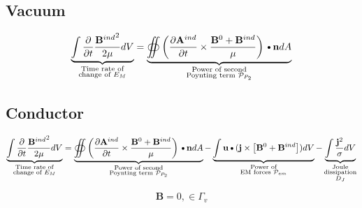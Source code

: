 \documentclass[11pt]{article}
\newcommand{\A}{\mathbf{A}}
\newcommand{\B}{\mathbf{B}}
\newcommand{\PD}{\partial}
\newcommand{\J}{\mathbf{j}}
\newcommand{\N}{\mathbf{n}}
\newcommand{\JSS}{\frac{\mathbf{j}^2}{\sigma}}
\newcommand{\U}{\mathbf{u}}
\newcommand{\DOT}{\text{\textbullet}}
\begin{document}
\subsection{Vacuum}
\begin{equation}
	\underbrace{\int \frac{\PD }{\PD t} \frac{{\B^{ind}}^2}{2 \mu} dV}_
	{\substack{\text{Time rate of}\\\text{change of $E_M$}}}
	=
	\underbrace{\oiint \left( \frac{\PD \A^{ind}}{\PD t} \times \frac{\B^{0} + \B^{ind}}{\mu} \right)\DOT \N dA }_
	{\substack{\text{Power of second}\\\text{Poynting term $\mathcal P_{P_2}$}}}
\end{equation}
\subsection{Conductor}
\begin{equation}
	\underbrace{\int \frac{\PD }{\PD t} \frac{{\B^{ind}}^2}{2 \mu} dV}_
	{\substack{\text{Time rate of}\\\text{change of $E_M$}}}
	= 
	\underbrace{\oiint \left( \frac{\PD \A^{ind}}{\PD t} \times \frac{\B^{0} + \B^{ind}}{\mu} \right)\DOT \N dA }_
	{\substack{\text{Power of second}\\\text{Poynting term $\mathcal P_{P_2}$}}}
	- \underbrace{\int \U \DOT (\J \times \left[ \B^0 + \B^{ind} \right]) dV}_
	{\substack{\text{Power of}\\\text{EM forces $\mathcal P_{em}$}}}
	- \underbrace{\int \JSS dV}_
	{\substack{\text{Joule}\\\text{dissipation}\\\text{$D_J$}}}
\end{equation}

\begin{equation}
	\B = 0, \in \Gamma_v
\end{equation}
\end{document}

